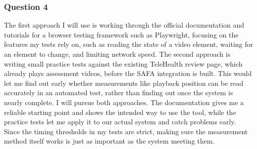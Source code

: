 \documentclass[12pt, titlepage]{article}
\renewcommand{\_}{\oldunderscore\allowbreak}
\begin{document}
\subsubsection*{Question 4}
The first approach I will use is working through the official documentation and tutorials for a browser testing framework such as Playwright, focusing on the features my tests rely on, such as reading the state of a video element, waiting for an element to change, and limiting network speed. 
The second approach is writing small practice tests against the existing TeleHealth review page, which already plays assessment videos, before the SAFA integration is built. 
This would let me find out early whether measurements like playback position can be read accurately in an automated test, rather than finding out once the system is nearly complete. 
I will pursue both approaches. 
The documentation gives me a reliable starting point and shows the intended way to use the tool, while the practice tests let me apply it to our actual system and catch problems early. 
Since the timing thresholds in my tests are strict, making sure the measurement method itself works is just as important as the system meeting them.
\end{document}
